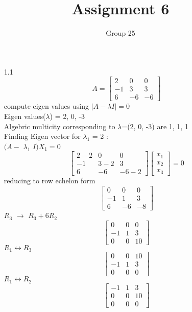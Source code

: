 \documentclass[12pt]{article}
\title{Assignment 6}
\author{Group 25}
\begin{document}
\maketitle

\subsection*{}
\begin{enumerate}[label=\alph*)]
\item[1.1]
\[
A = \begin{bmatrix} 2 & 0 & 0\\-1 & 3 & 3\\6 & -6 & -6 \end{bmatrix}
\]
compute eigen values using $|A - $$\lambda$$I| = 0$\\
Eigen values($\lambda$) = 2, 0, -3\\
Algebric multicity corresponding to $\lambda$=(2, 0, -3) are 1, 1, 1\\
Finding Eigen vector for $\lambda_{1}$ = 2 :\\
$(A-$ $\lambda_{1}$ $I)X_{1} = 0$
\[
\begin{bmatrix} 2-2 & 0 & 0\\-1 & 3-2 & 3\\6 & -6 & -6-2\end{bmatrix}\begin{bmatrix} x_{1}\\x_{2}\\x_{3}\end{bmatrix} = 0\]
reducing to row echelon form
\[
\begin{bmatrix} 0 & 0 & 0\\-1 & 1 & 3\\6 & -6 & -8\end{bmatrix}
\]
$R_{3}$ $\rightarrow$ $R_{3} + 6R_{2}$
\[
\begin{bmatrix} 0 & 0 & 0\\-1 & 1 & 3\\0 & 0 & 10\end{bmatrix}
\]
$R_{1}$$\leftrightarrow$$R_{3}$
\[
\begin{bmatrix} 0 & 0 & 10\\-1 & 1 & 3\\0 & 0 & 0\end{bmatrix}
\]
$R_{1}$$\leftrightarrow$$R_{2}$
\[
\begin{bmatrix} -1 & 1 & 3\\0 & 0 & 10\\0 & 0 & 0\end{bmatrix}
\]
\end{enumerate}
\end{document}
